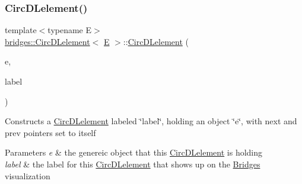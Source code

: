 \subsubsection{\texorpdfstring{CircDLelement()}{CircDLelement()}\hspace{0.1cm}{\footnotesize\ttfamily [2/4]}}
{\footnotesize\ttfamily template$<$typename E$>$ \\
\mbox{\hyperlink{classbridges_1_1_circ_d_lelement}{bridges\+::\+Circ\+D\+Lelement}}$<$ \mbox{\hyperlink{namespacebridges_acfb0a4f7877d8f63de3e6862004c50eda3a3ea00cfc35332cedf6e5e9a32e94da}{E}} $>$\+::\mbox{\hyperlink{classbridges_1_1_circ_d_lelement}{Circ\+D\+Lelement}} (\begin{DoxyParamCaption}\item[{\mbox{\hyperlink{namespacebridges_acfb0a4f7877d8f63de3e6862004c50eda3a3ea00cfc35332cedf6e5e9a32e94da}{E}}}]{e,  }\item[{string}]{label }\end{DoxyParamCaption})\hspace{0.3cm}{\ttfamily [inline]}}

Constructs a \mbox{\hyperlink{classbridges_1_1_circ_d_lelement}{Circ\+D\+Lelement}} labeled \char`\"{}label\char`\"{}, holding an object \char`\"{}e\char`\"{}, with next and prev pointers set to itself 
\begin{DoxyParams}{Parameters}
{\em e} & the genereic object that this \mbox{\hyperlink{classbridges_1_1_circ_d_lelement}{Circ\+D\+Lelement}} is holding \\
\hline
{\em label} & the label for this \mbox{\hyperlink{classbridges_1_1_circ_d_lelement}{Circ\+D\+Lelement}} that shows up on the \mbox{\hyperlink{classbridges_1_1_bridges}{Bridges}} visualization \\
\hline
\end{DoxyParams}
\mbox{\label{classbridges_1_1_circ_d_lelement_a9d0cf8a5b60e3fedc1ba1ad792570934}} 
